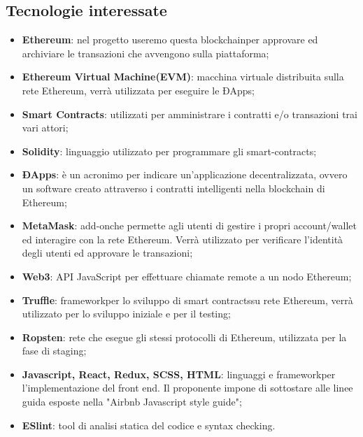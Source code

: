 \subsection{Tecnologie interessate}
\begin{itemize}
  
	\item \textbf{Ethereum\glo}: nel progetto useremo questa blockchain\glosp per approvare ed archiviare le transazioni che avvengono sulla piattaforma;
	\item \textbf{Ethereum Virtual Machine\glosp (EVM)}: macchina virtuale distribuita sulla rete Ethereum\glo, verrà utilizzata per eseguire le ÐApps\glo; 
	\item \textbf{Smart Contracts\glo}: utilizzati per amministrare i contratti e/o transazioni trai vari attori;
	\item \textbf{Solidity}: linguaggio utilizzato per programmare gli smart-contracts\glo;
	\item \textbf{ÐApps\glo}: è un acronimo per indicare un'applicazione decentralizzata, ovvero un software creato attraverso i contratti intelligenti nella blockchain di Ethereum\glo;
	\item \textbf{MetaMask\glo}: add-on\glosp che permette agli utenti di gestire i propri account/wallet ed interagire con la rete Ethereum\glo. Verrà utilizzato per verificare l'identità degli utenti ed approvare le transazioni; 
	\item \textbf{Web3}: API JavaScript per effettuare chiamate remote a un nodo Ethereum\glo;
	\item \textbf{Truffle}: framework\glosp per lo sviluppo di smart contracts\glosp su rete Ethereum\glo, verrà utilizzato per lo sviluppo iniziale e per il testing;
	\item \textbf {Ropsten}: rete che esegue gli stessi protocolli di Ethereum\glo, utilizzata per la fase di staging\glo;
	\item \textbf{Javascript, React\glo, Redux\glo, SCSS\glo, HTML}: linguaggi e framework\glosp per l'implementazione del front end\glo. Il proponente impone di sottostare alle linee guida esposte nella "Airbnb Javascript style guide";
	\item \textbf{ESlint\glo}: tool di analisi statica del codice e syntax checking.

\end{itemize}

